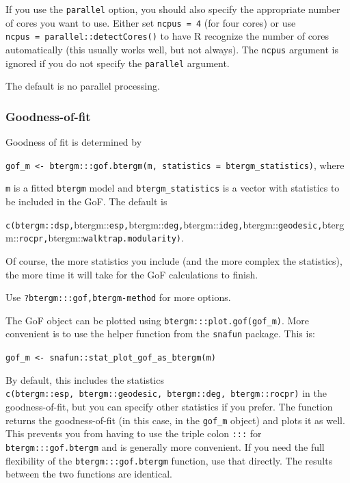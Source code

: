 \documentclass[
]{article}
\begin{document}
If you use the \texttt{parallel} option, you should also specify the
appropriate number of cores you want to use. Either set
\texttt{ncpus\ =\ 4} (for four cores) or use
\texttt{ncpus\ =\ parallel::detectCores()} to have R recognize the
number of cores automatically (this usually works well, but not always).
The \texttt{ncpus} argument is ignored if you do not specify the
\texttt{parallel} argument.

The default is no parallel processing.

\hypertarget{goodness-of-fit-1}{%
\subsubsection{Goodness-of-fit}\label{goodness-of-fit-1}}

Goodness of fit is determined by

\texttt{gof\_m\ \textless{}-\ btergm:::gof.btergm(m,\ statistics\ =\ btergm\_statistics)},
where

\texttt{m} is a fitted \texttt{btergm} model and
\texttt{btergm\_statistics} is a vector with statistics to be included
in the GoF. The default is

\texttt{c(btergm::dsp,}btergm::\texttt{esp,}btergm::\texttt{deg,}btergm::\texttt{ideg,}btergm::\texttt{geodesic,}btergm::\texttt{rocpr,}btergm::\texttt{walktrap.modularity)}.

Of course, the more statistics you include (and the more complex the
statistics), the more time it will take for the GoF calculations to
finish.

Use
\texttt{?btergm:::\textasciigrave{}gof,btergm-method\textasciigrave{}}
for more options.

The GoF object can be plotted using \texttt{btergm:::plot.gof(gof\_m)}.
More convenient is to use the helper function from the \texttt{snafun}
package. This is:

\texttt{gof\_m\ \textless{}-\ snafun::stat\_plot\_gof\_as\_btergm(m)}

By default, this includes the statistics
\texttt{c(btergm::esp,\ btergm::geodesic,\ btergm::deg,\ btergm::rocpr)}
in the goodness-of-fit, but you can specify other statistics if you
prefer. The function returns the goodness-of-fit (in this case, in the
\texttt{gof\_m} object) and plots it as well. This prevents you from
having to use the triple colon \texttt{:::} for
\texttt{btergm:::gof.btergm} and is generally more convenient. If you
need the full flexibility of the \texttt{btergm:::gof.btergm} function,
use that directly. The results between the two functions are identical.
\end{document}
